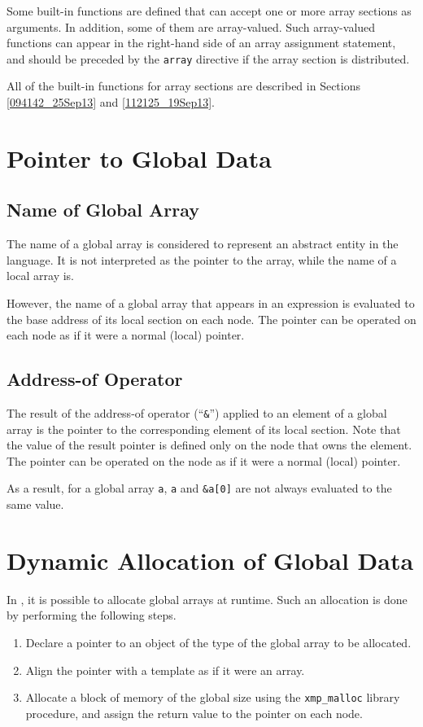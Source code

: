 Some built-in functions are defined that can accept one or more array
sections as arguments. In addition, some of them are array-valued.
%
Such array-valued functions can appear in the right-hand side of an
array assignment statement, and should be preceded by the {\tt array}
directive if the array section is distributed.

All of the built-in functions for array sections are described in
Sections \ref{094142_25Sep13} and \ref{112125_19Sep13}.


\section{Pointer to Global Data}
\label{sec:pointer to global data}

\subsection{Name of Global Array}

The name of a global array is considered to represent an abstract entity
in the {\XMP} language. It is not interpreted as the pointer to the array,
while the name of a local array is.

However, the name of a global array that appears in an expression is
evaluated to the base address of its local section on each node. The
pointer can be operated on each node as if it were a normal (local)
pointer.

\subsection{Address-of Operator}

The result of the address-of operator (``{\tt \&}'') applied to an
element of a global array is the pointer to the corresponding element of
its local section. Note that the value of the result pointer is defined
only on the node that owns the element. The pointer can be operated on
the node as if it were a normal (local) pointer.

As a result, for a global array {\tt a}, {\tt a} and {\tt \&a[0]} are
not always evaluated to the same value.

\section{Dynamic Allocation of Global Data}
\label{sec:Dynamic Allocation of Global Data in C}

In {\XMPC}, it is possible to allocate global arrays at runtime.
%
Such an allocation is done by performing the following steps.
%
\begin{enumerate}
 \item Declare a pointer to an object of the type of the global array to
       be allocated.
 \item Align the pointer with a template as if it were an array.
 \item Allocate a block of memory of the global size using the {\tt xmp\_malloc}
       library procedure, and assign the return value to the
       pointer on each node.
\end{enumerate}

